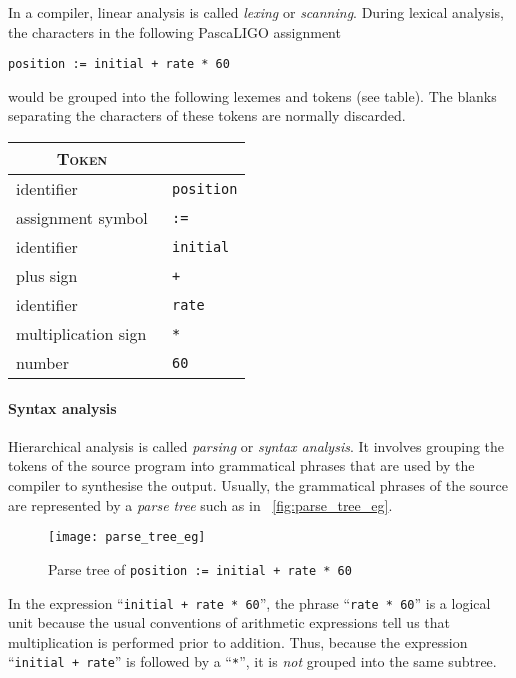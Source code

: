 \documentclass[12pt,a4paper]{article}
\begin{document}
In a compiler, linear analysis is called \emph{lexing} or
\emph{scanning}. During lexical analysis, the characters in the
following PascaLIGO assignment
\begin{verbatim}
position := initial + rate * 60
\end{verbatim}
\noindent would be grouped into the following lexemes and tokens (see
table). The blanks separating the characters of these tokens are
normally discarded.
\begin{center}
\begin{tabular}{l|>{\tt}l}
\toprule
  \multicolumn{1}{c}{\textsc{Token}}
& \multicolumn{1}{c}{\textsc{Lexeme}}\\
\midrule
identifier & position\\
assignment symbol & :=\\
identifier & initial\\
plus sign & +\\
identifier & rate\\
multiplication sign & *\\
number & 60\\
\bottomrule
\end{tabular}
\end{center}

\paragraph{Syntax analysis}

Hierarchical analysis is called \emph{parsing} or \emph{syntax
  analysis}. It involves grouping the tokens of the source program
into grammatical phrases that are used by the compiler to synthesise
the output. Usually, the grammatical phrases of the source are
represented by a \emph{parse tree} such as in
\fig~\vref{fig:parse_tree_eg}.
\begin{figure}[b]
\centering
\texttt{[image: parse\_tree\_eg]}
\caption{Parse tree of \texttt{position := initial + rate * 60}\label{fig:parse_tree_eg}}
\end{figure}
In the expression ``\texttt{initial + rate * 60}'', the phrase
``\texttt{rate * 60}'' is a logical unit because the usual conventions
of arithmetic expressions tell us that multiplication is performed
prior to addition. Thus, because the expression ``\texttt{initial +
  rate}'' is followed by a ``\verb+*+'', it is \emph{not} grouped into
the same subtree.
\end{document}
